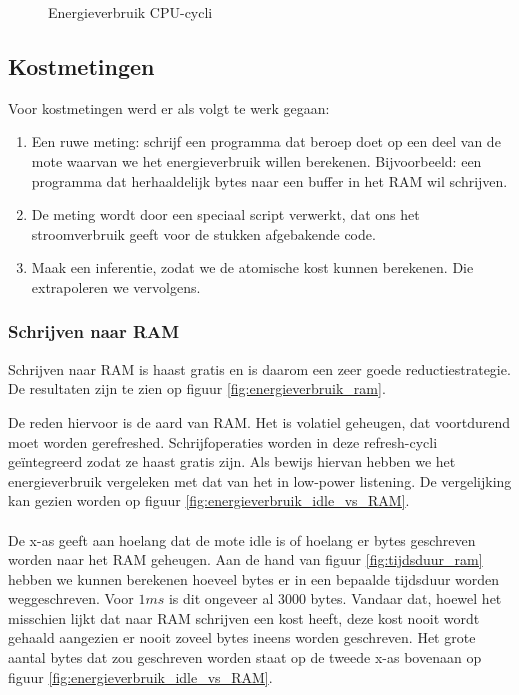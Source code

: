 \documentclass[11pt]{article}
\begin{document}
\begin{figure}[h]
\centering

\caption{Energieverbruik CPU-cycli}
\label{fig:energieverbruik_cpu}
\end{figure}

\subsection{Kostmetingen}

Voor kostmetingen werd er als volgt te werk gegaan:

\begin{enumerate}
\item Een ruwe meting: schrijf een programma dat beroep doet op een deel
van de mote waarvan we het energieverbruik willen berekenen. Bijvoorbeeld: een
programma dat herhaaldelijk bytes naar een buffer in het RAM wil schrijven. 
\item De meting wordt door een speciaal script verwerkt, dat ons het stroomverbruik geeft voor de stukken afgebakende code.
\item Maak een inferentie, zodat we de atomische kost kunnen berekenen. Die extrapoleren we vervolgens.
\end{enumerate}

\subsubsection{Schrijven naar RAM}

Schrijven naar RAM is haast gratis en is daarom een zeer goede
reductiestrategie. De resultaten zijn te zien op figuur \ref{fig:energieverbruik_ram}.

De reden hiervoor is de aard van RAM. Het is volatiel geheugen, dat voortdurend
moet worden gerefreshed. Schrijfoperaties worden in deze refresh-cycli
ge\"integreerd zodat ze haast gratis zijn. Als bewijs hiervan hebben we het energieverbruik vergeleken met dat van het in low-power listening. 
De vergelijking kan gezien worden op figuur \ref{fig:energieverbruik_idle_vs_RAM}.\\
\\
De x-as geeft aan hoelang dat de mote idle is of hoelang er bytes geschreven worden naar het RAM geheugen. Aan de hand van figuur \ref{fig:tijdsduur_ram} hebben we kunnen berekenen hoeveel bytes er in een bepaalde tijdsduur worden weggeschreven. Voor $1ms$ is dit ongeveer al 3000 bytes. Vandaar dat, hoewel het misschien lijkt dat naar RAM schrijven een kost heeft, deze kost nooit wordt gehaald aangezien er nooit zoveel bytes ineens worden geschreven. Het grote aantal bytes dat zou geschreven worden staat op de tweede x-as bovenaan op figuur \ref{fig:energieverbruik_idle_vs_RAM}. 
\end{document}
